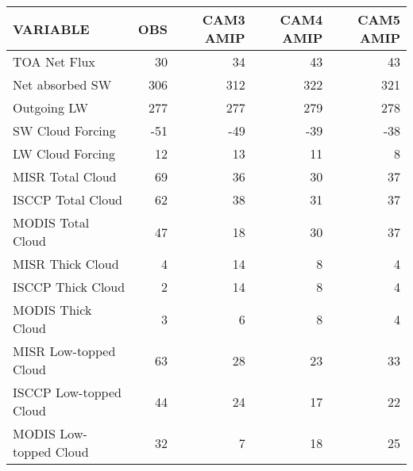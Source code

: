 \begin{tabular}{lrrrr}
\hline
                VARIABLE &                      OBS &                CAM3 AMIP &                CAM4 AMIP &                CAM5 AMIP \\ \hline
            TOA Net Flux &                       30 &                       34 &                       43 &                       43 \\
         Net absorbed SW &                      306 &                      312 &                      322 &                      321 \\
             Outgoing LW &                      277 &                      277 &                      279 &                      278 \\
        SW Cloud Forcing &                      -51 &                      -49 &                      -39 &                      -38 \\
        LW Cloud Forcing &                       12 &                       13 &                       11 &                        8 \\
        MISR Total Cloud &                       69 &                       36 &                       30 &                       37 \\
       ISCCP Total Cloud &                       62 &                       38 &                       31 &                       37 \\
       MODIS Total Cloud &                       47 &                       18 &                       30 &                       37 \\
        MISR Thick Cloud &                        4 &                       14 &                        8 &                        4 \\
       ISCCP Thick Cloud &                        2 &                       14 &                        8 &                        4 \\
       MODIS Thick Cloud &                        3 &                        6 &                        8 &                        4 \\
   MISR Low-topped Cloud &                       63 &                       28 &                       23 &                       33 \\
  ISCCP Low-topped Cloud &                       44 &                       24 &                       17 &                       22 \\
  MODIS Low-topped Cloud &                       32 &                        7 &                       18 &                       25 \\

\end{tabular}
